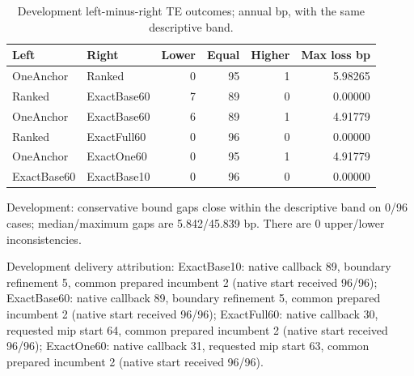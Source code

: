 \begin{table}[htbp]\centering\small

\caption{Development left-minus-right TE outcomes; annual bp, with the same descriptive band.}

\begin{tabular}{llrrrr}\toprule

Left & Right & Lower & Equal & Higher & Max loss bp\\\midrule

OneAnchor & Ranked & 0 & 95 & 1 & 5.98265\\

Ranked & ExactBase60 & 7 & 89 & 0 & 0.00000\\

OneAnchor & ExactBase60 & 6 & 89 & 1 & 4.91779\\

Ranked & ExactFull60 & 0 & 96 & 0 & 0.00000\\

OneAnchor & ExactOne60 & 0 & 95 & 1 & 4.91779\\

ExactBase60 & ExactBase10 & 0 & 96 & 0 & 0.00000\\

\bottomrule\end{tabular}\end{table}

Development: conservative bound gaps close within the descriptive band on 0/96 cases; median/maximum gaps are 5.842/45.839 bp. There are 0 upper/lower inconsistencies.

Development delivery attribution: ExactBase10: native callback 89, boundary refinement 5, common prepared incumbent 2 (native start received 96/96); ExactBase60: native callback 89, boundary refinement 5, common prepared incumbent 2 (native start received 96/96); ExactFull60: native callback 30, requested mip start 64, common prepared incumbent 2 (native start received 96/96); ExactOne60: native callback 31, requested mip start 63, common prepared incumbent 2 (native start received 96/96).

